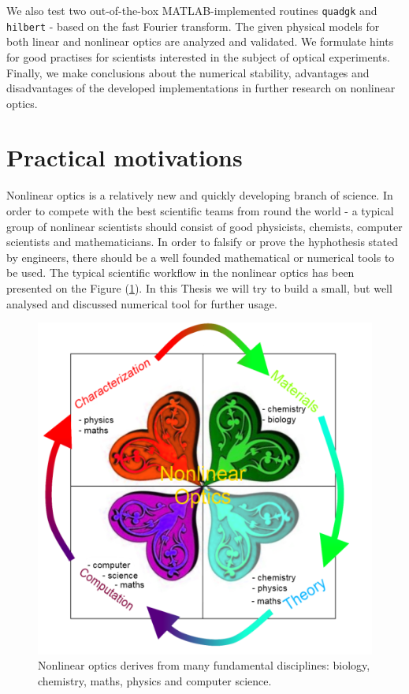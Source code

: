 \documentclass[12pt,twoside,a4paper]{article}
\def\emptyline{\vspace{12pt}}
\numberwithin{equation}{subsection}
\numberwithin{figure}{subsection}
\begin{document}
We also test two out-of-the-box MATLAB-implemented routines \texttt{quadgk} and \texttt{hil\-bert} - based on the fast Fourier transform. The given physical models for both linear and nonlinear optics are analyzed and validated. We formulate hints for good practises for scientists interested in the subject of optical experiments. Finally, we make conclusions about the numerical stability, advantages and disadvantages of the developed implementations in further research on nonlinear optics.

\emptyline

\section{Practical motivations} \label{chap:practical_motivations}
Nonlinear optics is a relatively new and quickly developing branch of science. In order to compete with the best scientific teams from round the world - a typical group of nonlinear scientists should consist of good physicists, chemists, computer scientists and mathematicians. In order to falsify or prove the hyphothesis stated by engineers, there should be a well founded mathematical or numerical tools to be used. The typical scientific workflow in the nonlinear optics has been presented on the Figure (\ref{fig:practical_nlo}). In this Thesis we will try to build a small, but well analysed and discussed numerical tool for further usage.


\begin{figure} 
 \includegraphics{img/nlo.png}
 \caption{Nonlinear optics derives from many fundamental disciplines: biology, chemistry, maths, physics and computer science. \label{fig:practical_nlo}}
\end{figure}
\end{document}
